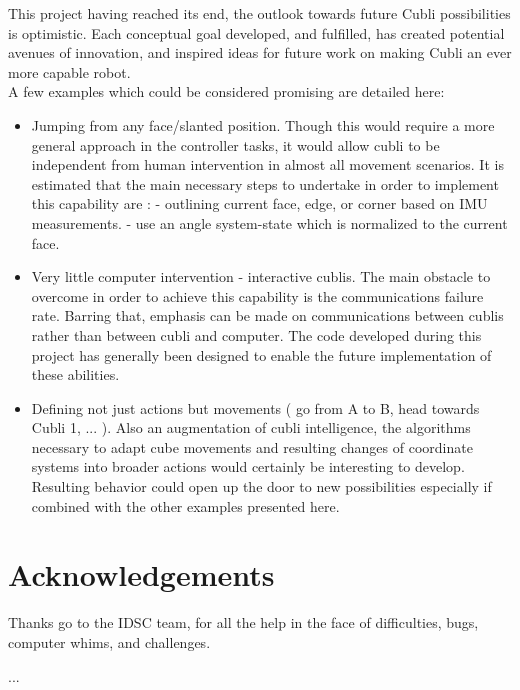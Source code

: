 This project having reached its end, the outlook towards future Cubli possibilities is optimistic. Each conceptual goal developed, and fulfilled, has created potential avenues of innovation, and inspired ideas for future work on making Cubli an ever more capable robot.\\

A few examples which could be considered promising are detailed here:

\begin{itemize}
\item Jumping from any face/slanted position. Though this would require a more general approach in the controller tasks, it would allow cubli to be independent from human intervention in almost all movement scenarios. It is estimated that the main necessary steps to undertake in order to implement this capability are : - outlining current face, edge, or corner based on IMU measurements. - use an angle system-state which is normalized to the current face.

\item Very little computer intervention - interactive cublis. The main obstacle to overcome in order to achieve this capability is the communications failure rate. Barring that, emphasis can  be made on communications between cublis rather than between cubli and computer. The code developed during this project has generally been designed to enable the future implementation of these abilities.

\item Defining not just actions but movements ( go from A to B, head towards Cubli 1, ... ). Also an augmentation of cubli intelligence, the algorithms necessary to adapt cube movements and resulting changes of coordinate systems into broader actions would certainly be interesting to develop. Resulting behavior could open up the door to new possibilities especially  if combined with the other examples presented here.

\end{itemize}

\section{Acknowledgements}

Thanks go to the IDSC team, for all the help in the face of difficulties, bugs, computer whims, and challenges.

...



